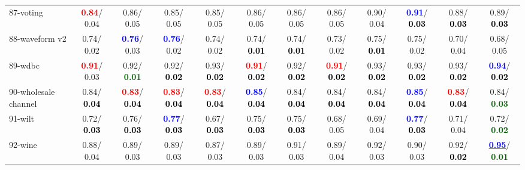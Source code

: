 \begin{table}[h]
\begin{center}
{\begin{tabular}{lc|c|c|c|c|c|c|c|c|c|c}
87-voting & \textcolor{red}{\textbf{  0.84}}/  0.04 &   0.86/  0.05 &   0.85/  0.05 &   0.85/  0.05 &   0.86/  0.05 &   0.86/  0.05 &   0.86/  0.05 &   0.90/  0.04 & \textcolor{blue}{\textbf{  0.91}}/\textcolor{black}{\textbf{  0.03}} &   0.88/\textcolor{black}{\textbf{  0.03}} &   0.89/\textcolor{black}{\textbf{  0.03}} \\
88-waveform v2 &   0.74/  0.02 & \textcolor{blue}{\textbf{  0.76}}/  0.03 & \textcolor{blue}{\textbf{  0.76}}/  0.02 &   0.74/  0.02 &   0.74/\textcolor{black}{\textbf{  0.01}} &   0.74/\textcolor{black}{\textbf{  0.01}} &   0.73/  0.02 &   0.75/\textcolor{black}{\textbf{  0.01}} &   0.75/  0.02 &   0.70/  0.04 &   0.68/  0.05 \\
89-wdbc & \textcolor{red}{\textbf{  0.91}}/  0.03 &   0.92/\textcolor{darkgreen}{\textbf{  0.01}} &   0.92/\textcolor{black}{\textbf{  0.02}} &   0.93/\textcolor{black}{\textbf{  0.02}} & \textcolor{red}{\textbf{  0.91}}/\textcolor{black}{\textbf{  0.02}} &   0.92/\textcolor{black}{\textbf{  0.02}} & \textcolor{red}{\textbf{  0.91}}/\textcolor{black}{\textbf{  0.02}} &   0.93/\textcolor{black}{\textbf{  0.02}} &   0.93/\textcolor{black}{\textbf{  0.02}} &   0.93/\textcolor{black}{\textbf{  0.02}} & \textcolor{blue}{\textbf{  0.94}}/\textcolor{black}{\textbf{  0.02}} \\
90-wholesale channel &   0.84/\textcolor{black}{\textbf{  0.04}} & \textcolor{red}{\textbf{  0.83}}/\textcolor{black}{\textbf{  0.04}} & \textcolor{red}{\textbf{  0.83}}/\textcolor{black}{\textbf{  0.04}} & \textcolor{red}{\textbf{  0.83}}/\textcolor{black}{\textbf{  0.04}} & \textcolor{blue}{\textbf{  0.85}}/\textcolor{black}{\textbf{  0.04}} &   0.84/\textcolor{black}{\textbf{  0.04}} &   0.84/\textcolor{black}{\textbf{  0.04}} &   0.84/\textcolor{black}{\textbf{  0.04}} & \textcolor{blue}{\textbf{  0.85}}/\textcolor{black}{\textbf{  0.04}} & \textcolor{red}{\textbf{  0.83}}/\textcolor{black}{\textbf{  0.04}} &   0.84/\textcolor{darkgreen}{\textbf{  0.03}} \\
91-wilt &   0.72/\textcolor{black}{\textbf{  0.03}} &   0.76/\textcolor{black}{\textbf{  0.03}} & \textcolor{blue}{\textbf{  0.77}}/\textcolor{black}{\textbf{  0.03}} &   0.67/\textcolor{black}{\textbf{  0.03}} &   0.75/\textcolor{black}{\textbf{  0.03}} &   0.75/\textcolor{black}{\textbf{  0.03}} &   0.68/  0.05 &   0.69/  0.04 & \textcolor{blue}{\textbf{  0.77}}/\textcolor{black}{\textbf{  0.03}} &   0.71/  0.04 &   0.72/\textcolor{darkgreen}{\textbf{  0.02}} \\
92-wine &   0.88/  0.04 &   0.89/  0.03 &   0.89/  0.03 &   0.87/  0.03 &   0.89/  0.03 &   0.91/  0.03 &   0.89/  0.04 &   0.92/  0.03 &   0.90/  0.03 &   0.92/\textcolor{black}{\textbf{  0.02}} & \underline{\textcolor{blue}{\textbf{  0.95}}}/\textcolor{darkgreen}{\textbf{  0.01}} \\ \hline

\end{tabular}}
\end{center}
\end{table}
